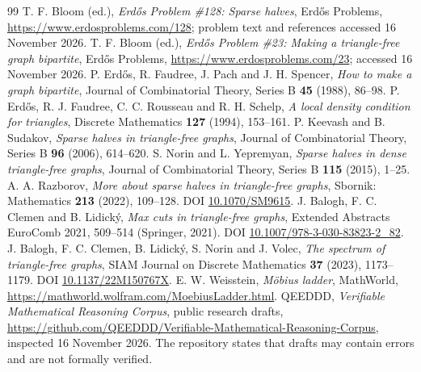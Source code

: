 \documentclass[11pt,a4paper]{article}
\begin{document}
\begin{thebibliography}{99}
 T. F. Bloom (ed.), \emph{Erd\H{o}s Problem \#128: Sparse halves}, Erd\H{o}s Problems, \url{https://www.erdosproblems.com/128}; problem text and references accessed 16 November 2026.
 T. F. Bloom (ed.), \emph{Erd\H{o}s Problem \#23: Making a triangle-free graph bipartite}, Erd\H{o}s Problems, \url{https://www.erdosproblems.com/23}; accessed 16 November 2026.
 P. Erd\H{o}s, R. Faudree, J. Pach and J. H. Spencer, \emph{How to make a graph bipartite}, Journal of Combinatorial Theory, Series B \textbf{45} (1988), 86--98.
 P. Erd\H{o}s, R. J. Faudree, C. C. Rousseau and R. H. Schelp, \emph{A local density condition for triangles}, Discrete Mathematics \textbf{127} (1994), 153--161.
 P. Keevash and B. Sudakov, \emph{Sparse halves in triangle-free graphs}, Journal of Combinatorial Theory, Series B \textbf{96} (2006), 614--620.
 S. Norin and L. Yepremyan, \emph{Sparse halves in dense triangle-free graphs}, Journal of Combinatorial Theory, Series B \textbf{115} (2015), 1--25.
 A. A. Razborov, \emph{More about sparse halves in triangle-free graphs}, Sbornik: Mathematics \textbf{213} (2022), 109--128. DOI \href{https://doi.org/10.1070/SM9615}{10.1070/SM9615}.
 J. Balogh, F. C. Clemen and B. Lidick\'y, \emph{Max cuts in triangle-free graphs}, Extended Abstracts EuroComb 2021, 509--514 (Springer, 2021). DOI \href{https://doi.org/10.1007/978-3-030-83823-2_82}{10.1007/978-3-030-83823-2\_82}.
 J. Balogh, F. C. Clemen, B. Lidick\'y, S. Norin and J. Volec, \emph{The spectrum of triangle-free graphs}, SIAM Journal on Discrete Mathematics \textbf{37} (2023), 1173--1179. DOI \href{https://doi.org/10.1137/22M150767X}{10.1137/22M150767X}.
 E. W. Weisstein, \emph{M\"obius ladder}, MathWorld, \url{https://mathworld.wolfram.com/MoebiusLadder.html}.
 QEEDDD, \emph{Verifiable Mathematical Reasoning Corpus}, public research drafts, \url{https://github.com/QEEDDD/Verifiable-Mathematical-Reasoning-Corpus}, inspected 16 November 2026. The repository states that drafts may contain errors and are not formally verified.
\end{thebibliography}
\end{document}
